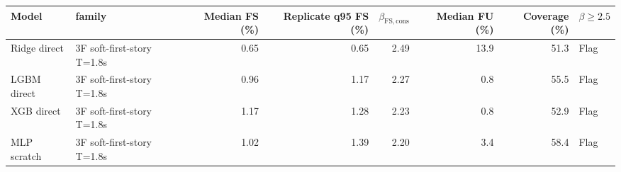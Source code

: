 \begin{tabular}{llrrrrrl}
\toprule
Model & family & Median FS (\%) & Replicate q95 FS (\%) & $\beta_{\mathrm{FS,cons}}$ & Median FU (\%) & Coverage (\%) & $\beta\ge2.5$ \\
\midrule
Ridge direct & 3F soft-first-story T=1.8s & 0.65 & 0.65 & 2.49 & 13.9 & 51.3 & Flag \\
LGBM direct & 3F soft-first-story T=1.8s & 0.96 & 1.17 & 2.27 & 0.8 & 55.5 & Flag \\
XGB direct & 3F soft-first-story T=1.8s & 1.17 & 1.28 & 2.23 & 0.8 & 52.9 & Flag \\
MLP scratch & 3F soft-first-story T=1.8s & 1.02 & 1.39 & 2.20 & 3.4 & 58.4 & Flag \\
\bottomrule
\end{tabular}
